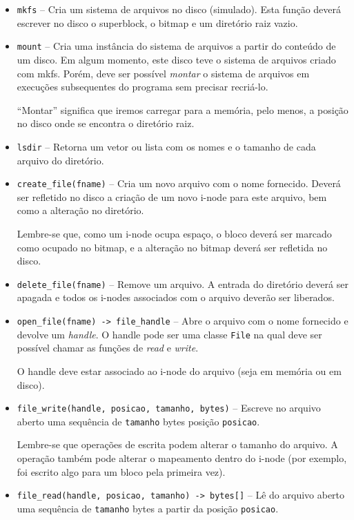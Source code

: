 \documentclass[a4paper, oneside,12pt]{article}
\begin{document}
\begin{itemize}
    \item \texttt{mkfs} -- Cria um sistema de arquivos no disco (simulado). Esta função deverá escrever no disco o superblock, o bitmap e um diretório raiz vazio.

    \item \texttt{mount} -- Cria uma instância do sistema de arquivos a partir do conteúdo de um disco. Em algum momento, este disco teve o sistema de arquivos criado com mkfs. Porém, deve ser possível \emph{montar} o sistema de arquivos em execuções subsequentes do programa sem precisar recriá-lo.

        ``Montar'' significa que iremos carregar para a memória, pelo menos, a posição no disco onde se encontra o diretório raiz.

    \item \texttt{lsdir} -- Retorna um vetor ou lista com os nomes e o tamanho de cada arquivo do diretório.

    \item \texttt{create\_file(fname)} -- Cria um novo arquivo com o nome fornecido. Deverá ser refletido no disco a criação de um novo i-node para este arquivo, bem como a alteração no diretório.

        Lembre-se que, como um i-node ocupa espaço, o bloco deverá ser marcado como ocupado no bitmap, e a alteração no bitmap deverá ser refletida no disco.

    \item \texttt{delete\_file(fname)} -- Remove um arquivo. A entrada do diretório deverá ser apagada e todos os i-nodes associados com o arquivo deverão ser liberados.

    \item \texttt{open\_file(fname) -> file\_handle} -- Abre o arquivo com o nome fornecido e devolve um \emph{handle}. O handle pode ser uma classe \texttt{File} na qual deve ser possível chamar as funções de \emph{read} e \emph{write}.

        O handle deve estar associado ao i-node do arquivo (seja em memória ou em disco).

    \item \texttt{file\_write(handle, posicao, tamanho, bytes)} -- Escreve no arquivo aberto uma sequência de \texttt{tamanho} bytes posição \texttt{posicao}.

        Lembre-se que operações de escrita podem alterar o tamanho do arquivo. A operação também pode alterar o mapeamento dentro do i-node (por exemplo, foi escrito algo para um bloco pela primeira vez).

    \item \texttt{file\_read(handle, posicao, tamanho) -> bytes[]} -- Lê do arquivo aberto uma sequência de \texttt{tamanho} bytes a partir da posição \texttt{posicao}.

\end{itemize}
\end{document}
